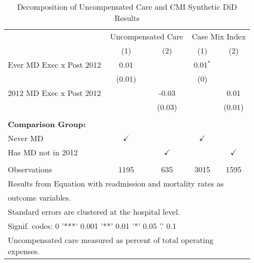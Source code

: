 \begin{table}[ht!]

\caption{\label{tab:MD_noMD_uncompCMI_decomp_synth}Decomposition of Uncompensated Care and CMI Synthetic DiD Results}
\centering
\begin{tabular}[t]{lcccc}
\toprule
\multicolumn{1}{c}{ } & \multicolumn{2}{c}{Uncompensated Care} & \multicolumn{2}{c}{Case Mix Index} \\
 & (1) & (2) & (1) & (2)\\
\midrule
Ever MD Exec x Post 2012 & 0.01 &  & 0.01$^{*}$ & \\
 & (0.01) &  & (0) & \\
2012 MD Exec x Post 2012 &  & -0.03 &  & 0.01\\
 &  & (0.03) &  & (0.01)\\
 &  &  &  & \\
\addlinespace
\textbf{Comparison Group:} &  &  &  & \\
Never MD & $\checkmark$ &  & $\checkmark$ & \\
Has MD not in 2012 &  & $\checkmark$ &  & $\checkmark$\\
 &  &  &  & \\
Observations & 1195 & 635 & 3015 & 1595\\
\bottomrule
\multicolumn{5}{l}{\textsuperscript{} Results from Equation with readmission and mortality rates as}\\
\multicolumn{5}{l}{outcome variables.}\\
\multicolumn{5}{l}{\textsuperscript{} Standard errors are clustered at the hospital level.}\\
\multicolumn{5}{l}{\textsuperscript{} Signif. codes: 0 '***' 0.001 '**' 0.01 '*' 0.05 '.' 0.1}\\
\multicolumn{5}{l}{\textsuperscript{} Uncompensated care measured as percent of total operating expenses.}\\
\end{tabular}
\end{table}
